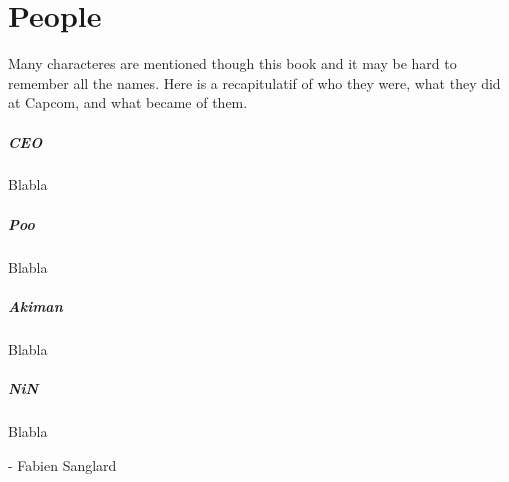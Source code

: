\chapter{People} 
Many characteres are mentioned though this book and it may be hard to remember all the names. Here is a recapitulatif of who they were, what they did at Capcom, and what became of them.

\paragraph{CEO} Blabla

\paragraph{Poo} Blabla

\paragraph{Akiman} Blabla

\paragraph{NiN} Blabla


- Fabien Sanglard
